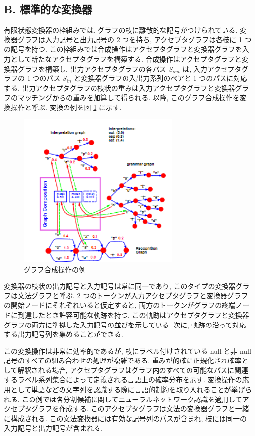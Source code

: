 \documentclass[twocolumn]{jarticle}     %
\begin{document}
\subsection*{B. 標準的な変換器}

有限状態変換器の枠組みでは, グラフの枝に離散的な記号がつけられている. 変換器グラフは入力記号と出力記号の 2 つを持ち, アクセプタグラフは各枝に 1 つの記号を持つ. この枠組みでは合成操作はアクセプタグラフと変換器グラフを入力として新たなアクセプタグラフを構築する.
合成操作はアクセプタグラフと変換器グラフを構築し, 出力アクセプタグラフの各パス $S_{out}$ は, 入力アクセプタグラフの 1 つのパス $S_{in}$ と変換器グラフの入出力系列のペアと 1 つのパスに対応する. 
出力アクセプタグラフの枝状の重みは入力アクセプタグラフと変換器グラフのマッチングからの重みを加算して得られる. 
以降, このグラフ合成操作を変換操作と呼ぶ. 
変換の例を図 \ref{fig:28} に示す. 
\begin{figure}[t]
  \centering
  \includegraphics[width=80mm]{assets/28.png}
  \caption{グラフ合成操作の例}
  \label{fig:28}
\end{figure}
変換器の枝状の出力記号と入力記号は常に同一であり, このタイプの変換器グラフは文法グラフと呼ぶ.
2 つのトークンが入力アクセプタグラフと変換器グラフの開始ノードにそれぞれいると仮定すると, 両方のトークンがグラフの終端ノードに到達したとき許容可能な軌跡を持つ. 
この軌跡はアクセプタグラフと変換器グラフの両方に準拠した入力記号の並びを示している. 次に, 軌跡の沿って対応する出力記号列を集めることができる.
\par
この変換操作は非常に効率的であるが, 枝にラベル付けされている null と非 null 記号のすべての組み合わせの処理が複雑である. 重みが的確に正規化され確率として解釈される場合, アクセプタグラフはグラフ内のすべての可能なパスに関連するラベル系列集合によって定義される言語上の確率分布を示す.
変換操作の応用として単語などの文字列を認識する際に言語的制約を取り入れることが挙げられる. この例では各分割候補に関してニューラルネットワーク認識を適用してアクセプタグラフを作成する. このアクセプタグラフは文法の変換器グラフと一緒に構成される. この文法変換器には有効な記号列のパスが含まれ, 枝には同一の入力記号と出力記号が含まれる. 
\end{document}
